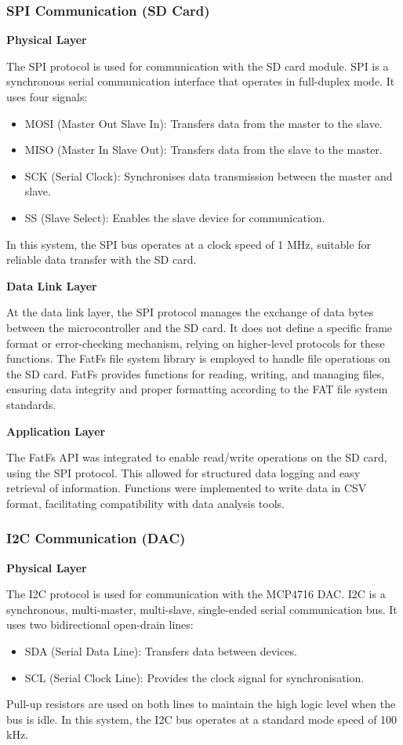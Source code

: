 \subsubsection{SPI Communication (SD Card)}

\textbf{Physical Layer}

The SPI protocol is used for communication with the SD card module. SPI is a synchronous serial communication 
interface that operates in full-duplex mode. It uses four signals:
\begin{itemize}
    \item MOSI (Master Out Slave In): Transfers data from the master to the slave.
    \item MISO (Master In Slave Out): Transfers data from the slave to the master.
    \item SCK (Serial Clock): Synchronises data transmission between the master and slave.
    \item SS (Slave Select): Enables the slave device for communication.
\end{itemize}
In this system, the SPI bus operates at a clock speed of 1 MHz, suitable for reliable data transfer 
with the SD card.

\textbf{Data Link Layer}

At the data link layer, the SPI protocol manages the exchange of data bytes between the microcontroller 
and the SD card. It does not define a specific frame format or error-checking mechanism, relying on 
higher-level protocols for these functions. The FatFs file system library is employed to handle file 
operations on the SD card. FatFs provides functions for reading, writing, and managing files, ensuring 
data integrity and proper formatting according to the FAT file system standards.

\textbf{Application Layer}

The FatFs API was integrated to enable read/write operations on the SD card, 
using the SPI protocol. This allowed for structured data logging and easy retrieval of information. 
Functions were implemented to write data in CSV format, facilitating compatibility with data analysis tools.

\subsubsection{I2C Communication (DAC)}

\textbf{Physical Layer}

The I2C protocol is used for communication with the MCP4716 DAC. I2C is a synchronous, multi-master, 
multi-slave, single-ended serial communication bus. It uses two bidirectional open-drain lines:
\begin{itemize}
    \item SDA (Serial Data Line): Transfers data between devices.
    \item SCL (Serial Clock Line): Provides the clock signal for synchronisation.
\end{itemize}
Pull-up resistors are used on both lines to maintain the high logic level when the bus is idle. 
In this system, the I2C bus operates at a standard mode speed of 100 kHz.

